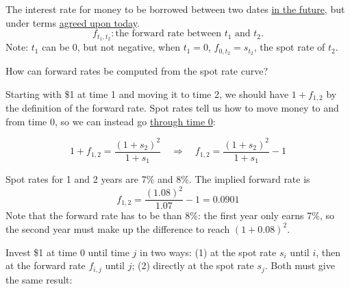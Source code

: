 \begin{definition}
    The interest rate for money to be borrowed between two dates \ul{in the future}, but under terms \ul{agreed upon today}. 
    \[f_{t_1,t_2}: \text{the forward rate between $t_1$ and $t_2$.}\]
    Note: $t_1$ can be 0, but not negative, when $t_1 = 0$, $f_{0, t_2} = s_{t_2}$, the spot rate of $t_2$.
\end{definition}
How can forward rates be computed from the spot rate curve?

Starting with \$1 at time 1 and moving it to time 2, we should have $1+f_{1,2}$ by the definition of the forward rate. Spot rates tell us how to move money to and from time 0, so we can instead go \ul{through time 0}:

\begin{center}
\end{center}

\[1+f_{1,2} = \frac{(1+s_2)^2}{1+s_1} \quad \Rightarrow \quad \boxed{f_{1,2} = \frac{(1+s_2)^2}{1+s_1} - 1}\]

\begin{example}
    Spot rates for 1 and 2 years are 7\% and 8\%. The implied forward rate is
    \[f_{1,2} = \frac{(1.08)^2}{1.07} - 1 = 0.0901\]
    Note that the forward rate has to be  than 8\%: the first year only earns 7\%, so the second year must make up the difference to reach $(1+0.08)^2$.
\end{example}

Invest \$1 at time 0 until time $j$ in two ways: (1) at the spot rate $s_i$ until $i$, then at the forward rate $f_{i,j}$ until $j$; (2) directly at the spot rate $s_j$. Both must give the same result:

